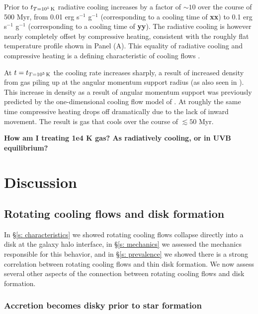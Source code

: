 \documentclass[fleqn,usenatbib]{mnras}
\newcommand{\tcon}{t_{T=10^5\,{\rm K}}}
\begin{document}
Prior to $\tcon$ radiative cooling increases by a factor of $\sim 10$ over the course of 500 Myr, from 0.01 erg s$^{-1}$ g$^{-1}$ (corresponding to a cooling time of \textbf{xx}) to 0.1 erg s$^{-1}$ g$^{-1}$ (corresponding to a cooling time of \textbf{yy}).
The radiative cooling is however nearly completely offset by compressive heating, consistent with the roughly flat temperature profile shown in Panel (A).
This equality of radiative cooling and compressive heating is a defining characteristic of cooling flows \citep{Mathews1978, McNamara2007, Stern2020}. 

At $t=\tcon$ the cooling rate increases sharply, a result of increased density from gas piling up at the angular momentum support radius (as also seen in \citealt{Trapp2021}).
This increase in density as a result of angular momentum support was previously predicted by the one-dimensional cooling flow model of \cite{Cowie1980}.
At roughly the same time compressive heating drops off dramatically due to the lack of inward movement.
The result is gas that cools over the course of $\lesssim 50$ Myr.

\textbf{
How am I treating 1e4 K gas?
As radiatively cooling, or in UVB equilibrium?
}

\section{Discussion}
\label{s: discussion}

\subsection{Rotating cooling flows and disk formation}
\label{s: disk formation}

In \S\ref{s: characteristics} we showed rotating cooling flows collapse directly into a disk at the galaxy halo interface, in \S\ref{s: mechanics} we assessed the mechanics responsible for this behavior, and in \S\ref{s: prevalence} we showed there is a strong correlation between rotating cooling flows and thin disk formation.
We now assess several other aspects of the connection between rotating cooling flows and disk formation.

\subsubsection{Accretion becomes disky prior to star formation}
\label{s: disk formation -- condition}
\end{document}
